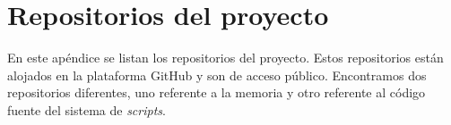 \chapter{Repositorios del proyecto}
\label{apen:repositorios_proyecto}

En este apéndice se listan los repositorios del proyecto. Estos repositorios
están alojados en la plataforma GitHub y son de acceso público. Encontramos 
dos repositorios diferentes, uno referente a la memoria y otro referente al
código fuente del sistema de \textit{scripts}.

\begin{table}[H]
    \centering
    \caption[Tabla de los repositorios de este proyecto]{Tabla de los repositorios de este proyecto (Elaboración propia)}
    \label{tab:repositorios_proyecto}
\end{table}